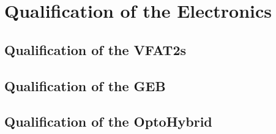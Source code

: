 \chapter{Qualification of the Electronics}
\label{chap:qualification}

    \section{Qualification of the VFAT2s}
    
    \section{Qualification of the GEB}

    \section{Qualification of the OptoHybrid}
